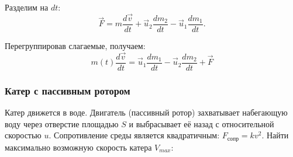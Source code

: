 Разделим на $dt$:
\[
\vec{F} = m \frac{d\vec{v}}{dt} + \vec{u}_2 \frac{dm_2}{dt} - \vec{u}_1 \frac{dm_1}{dt}.
\]

Перегруппировав слагаемые, получаем:
\[\boxed{
m(t) \frac{d\vec{v}}{dt} = \vec{u}_1 \frac{dm_1}{dt} - \vec{u}_2 \frac{dm_2}{dt} + \vec{F}
}\]

\subsubsection{Катер с пассивным ротором}

Катер движется в воде. Двигатель (пассивный ротор) захватывает набегающую воду через отверстие площадью $S$ и выбрасывает её назад с относительной скоростью $u$. Сопротивление среды является квадратичным: $F_{\text{сопр}} = kv^2$. Найти максимально возможную скорость катера $V_{max}$:

